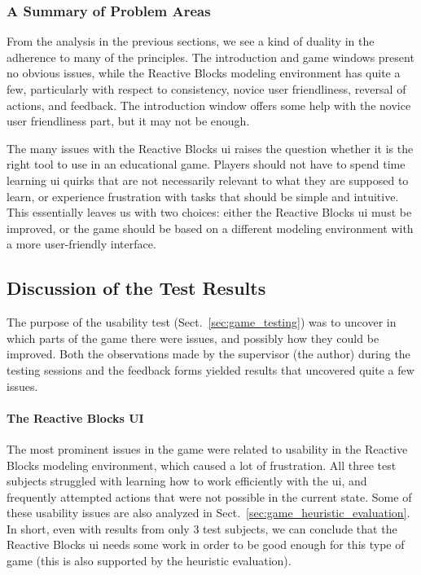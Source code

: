 \subsubsection{A Summary of Problem Areas}
From the analysis in the previous sections, we see a kind of duality in the adherence to many of the principles. The introduction and game windows present no obvious issues, while the Reactive Blocks modeling environment has quite a few, particularly with respect to consistency, novice user friendliness, reversal of actions, and feedback. The introduction window offers some help with the novice user friendliness part, but it may not be enough.

\noindent
The many issues with the Reactive Blocks \gls{ui} raises the question whether it is the right tool to use in an educational game. Players should not have to spend time learning \gls{ui} quirks that are not necessarily relevant to what they are supposed to learn, or experience frustration with tasks that should be simple and intuitive. This essentially leaves us with two choices: either the Reactive Blocks \gls{ui} must be improved, or the game should be based on a different modeling environment with a more user-friendly interface.

\subsection{Discussion of the Test Results}
\label{sec:game_test_discussion}
The purpose of the usability test (Sect.~\ref{sec:game_testing}) was to uncover in which parts of the game there were issues, and possibly how they could be improved. Both the observations made by the supervisor (the author) during the testing sessions and the feedback forms yielded results that uncovered quite a few issues.

\paragraph{The Reactive Blocks UI} The most prominent issues in the game were related to usability in the Reactive Blocks modeling environment, which caused a lot of frustration. All three test subjects struggled with learning how to work efficiently with the \gls{ui}, and frequently attempted actions that were not possible in the current state. Some of these usability issues are also analyzed in Sect.~\ref{sec:game_heuristic_evaluation}. In short, even with results from only 3 test subjects, we can conclude that the Reactive Blocks \gls{ui} needs some work in order to be good enough for this type of game (this is also supported by the heuristic evaluation).

